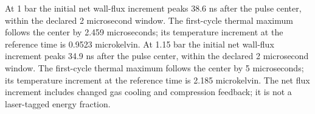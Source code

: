 At 1 bar the initial net wall-flux increment peaks 38.6 ns after the pulse center, within the declared 2 microsecond window. The first-cycle thermal maximum follows the center by 2.459 microseconds; its temperature increment at the reference time is 0.9523 microkelvin. At 1.15 bar the initial net wall-flux increment peaks 34.9 ns after the pulse center, within the declared 2 microsecond window. The first-cycle thermal maximum follows the center by 5 microseconds; its temperature increment at the reference time is 2.185 microkelvin. The net flux increment includes changed gas cooling and compression feedback; it is not a laser-tagged energy fraction.
